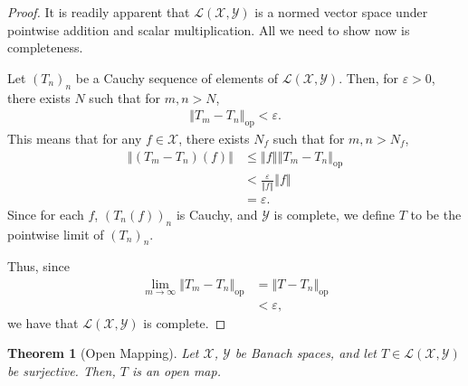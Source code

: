 \documentclass[10pt]{extarticle}
\newcommand{\norm}[1]{\left\Vert #1\right\Vert}
\newcommand{\ve}{\varepsilon}
\theoremstyle{plain}
\newtheorem*{theorem}{Theorem}
\theoremstyle{definition}
\theoremstyle{note}
\renewcommand{\newline}{\hfill\break}
\begin{document}
\begin{proof}
  It is readily apparent that $\mathcal{L}\left(\mathcal{X},\mathcal{Y}\right)$ is a normed vector space under pointwise addition and scalar multiplication. All we need to show now is completeness. \newline

  Let $\left(T_n\right)_n$ be a Cauchy sequence of elements of $\mathcal{L}\left(\mathcal{X},\mathcal{Y}\right)$. Then, for $\ve > 0$, there exists $N$ such that for $m,n > N$,
  \begin{align*}
    \norm{T_m - T_n}_{\text{op}} < \ve.
  \end{align*}
  This means that for any $f\in \mathcal{X}$, there exists $N_f$ such that for $m,n > N_f$,
  \begin{align*}
    \norm{\left(T_m - T_n\right)(f)} &\leq \norm{f}\norm{T_m-T_n}_{\text{op}}\\
                                     &< \frac{\ve}{\norm{f}} \norm{f}\\
                                     &= \ve.
  \end{align*}
  Since for each $f$, $\left(T_n(f)\right)_n$ is Cauchy, and $\mathcal{Y}$ is complete, we define $T$ to be the pointwise limit of $\left(T_n\right)_n$.\newline

  Thus, since
  \begin{align*}
    \lim_{m\rightarrow\infty}\norm{T_m - T_n}_{\text{op}} &= \norm{T - T_n}_{\text{op}}\\
                                                          &< \ve,
  \end{align*}
  we have that $\mathcal{L}\left(\mathcal{X},\mathcal{Y}\right)$ is complete.
\end{proof}
\begin{theorem}[Open Mapping]
  Let $\mathcal{X}$, $\mathcal{Y}$ be Banach spaces, and let $T\in \mathcal{L}\left(\mathcal{X},\mathcal{Y}\right)$ be surjective. Then, $T$ is an open map.
\end{theorem}
\end{document}
